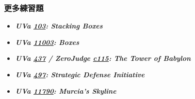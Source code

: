 \subsubsection*{更多練習題}
\begin{itemize}[label={\PencilLeftDown}]
\item \textbf{\textit{UVa \href{http://uva.onlinejudge.org/external/1/103.html}{103}: Stacking Boxes}}
\item \textbf{\textit{UVa \href{http://uva.onlinejudge.org/external/110/11003.html}{11003}: Boxes}}
\item \textbf{\textit{UVa \href{http://uva.onlinejudge.org/external/4/437.html}{437} / ZeroJudge \href{http://zerojudge.tw/ShowProblem?problemid=c115}{c115}: The Tower of Babylon}}
\item \textbf{\textit{UVa \href{http://uva.onlinejudge.org/external/4/497.html}{497}: Strategic Defense Initiative}}
\item \textbf{\textit{UVa \href{http://uva.onlinejudge.org/external/117/11790.html}{11790}: Murcia's Skyline}}
\end{itemize}